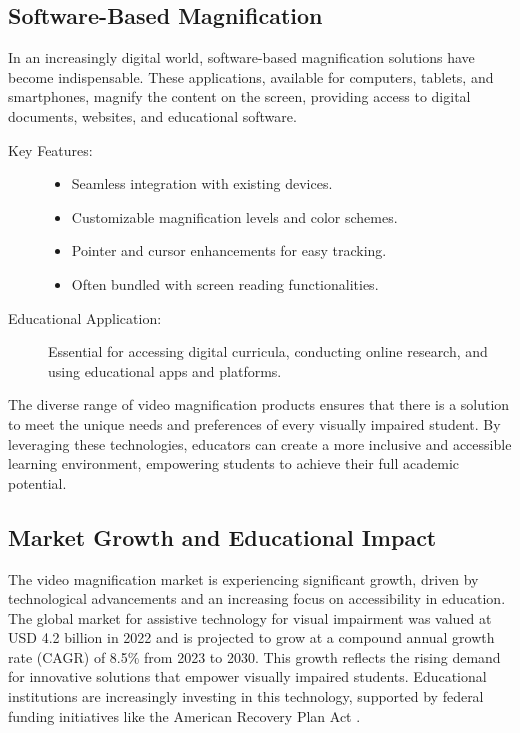 \subsection{Software-Based Magnification}
In an increasingly digital world, software-based magnification solutions have become indispensable. These applications, available for computers, tablets, and smartphones, magnify the content on the screen, providing access to digital documents, websites, and educational software.\supercite{BOIAScreenMagnifiers, PerkinsScreenMagnification}

\begin{description}
	\item[Key Features:]
	      \begin{itemize}
		      \item Seamless integration with existing devices.
		      \item Customizable magnification levels and color schemes.
		      \item Pointer and cursor enhancements for easy tracking.
		      \item Often bundled with screen reading functionalities.
	      \end{itemize}
	\item[Educational Application:] Essential for accessing digital curricula, conducting online research, and using educational apps and platforms.
\end{description}

The diverse range of video magnification products ensures that there is a solution to meet the unique needs and preferences of every visually impaired student. By leveraging these technologies, educators can create a more inclusive and accessible learning environment, empowering students to achieve their full academic potential.

\subsection{Market Growth and Educational Impact}
The video magnification market is experiencing significant growth, driven by technological advancements and an increasing focus on accessibility in education. The global market for assistive technology for visual impairment was valued at USD 4.2 billion in 2022 and is projected to grow at a compound annual growth rate (CAGR) of 8.5\% from 2023 to 2030. This growth reflects the rising demand for innovative solutions that empower visually impaired students. Educational institutions are increasingly investing in this technology, supported by federal funding initiatives like the American Recovery Plan Act \supercite{AmericanRecoveryAct}.

